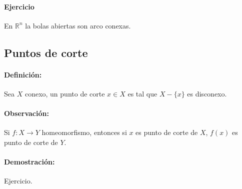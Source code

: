 \paragraph{Ejercicio} En $\mathbb R^n$ la bolas abiertas son arco conexas.


\subsection{Puntos de corte}

\paragraph{Definición:} Sea $X$ conexo, un punto de corte $x \in X$ es tal que $X - \{x\}$ es disconexo. 

\paragraph{Observación:} Si $f: X \to Y$ homeomorfismo, entonces si $x$ es punto de corte de $X$, $f(x)$ es punto de corte de $Y$.
\paragraph{Demostración:} Ejercicio.

